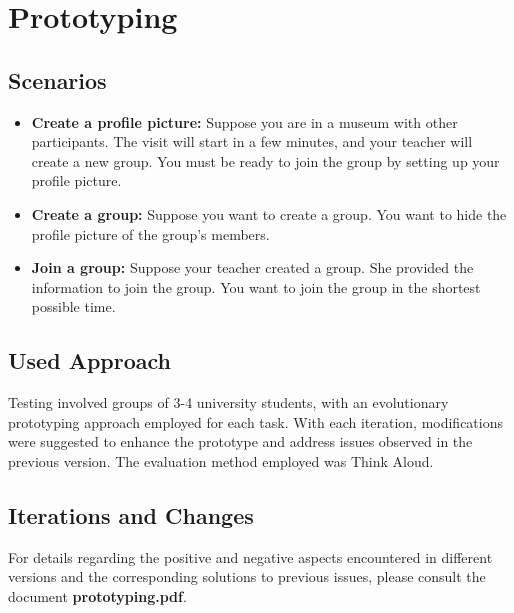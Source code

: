 \section{Prototyping}
\subsection{Scenarios}
\begin{itemize}
    \item \textbf{Create a profile picture:} Suppose you are in a museum with other participants. The visit will start in a few minutes, and your teacher will create a new group. You must be ready to join the group by setting up your profile picture.
    \item \textbf{Create a group:} Suppose you want to create a group. You want to hide the profile picture of the group's members.
    \item \textbf{Join a group:} Suppose your teacher created a group. She provided the information to join the group. You want to join the group in the shortest possible time.
\end{itemize}

\subsection{Used Approach}
Testing involved groups of 3-4 university students, with an evolutionary prototyping approach employed for each task.  With each iteration, modifications were suggested to enhance the prototype and address issues observed in the previous version. The evaluation method employed was Think Aloud.

\subsection{Iterations and Changes}
For details regarding the positive and negative aspects encountered in different versions and the corresponding solutions to previous issues, please consult the document \textbf{prototyping.pdf}.
